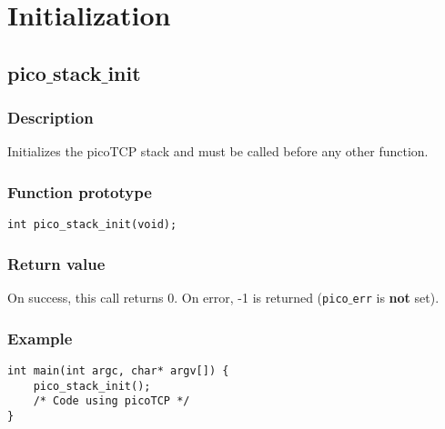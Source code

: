 \section{Initialization}

\subsection{pico$\_$stack$\_$init}

\subsubsection*{Description}
Initializes the picoTCP stack and must be called before any other function.

\subsubsection*{Function prototype}
\begin{verbatim}
int pico_stack_init(void);
\end{verbatim}

\subsubsection*{Return value}
On success, this call returns 0.
On error, -1 is returned (\texttt{pico$\_$err} is \textbf{not} set).

\subsubsection*{Example}
\begin{verbatim}
int main(int argc, char* argv[]) {
    pico_stack_init();
    /* Code using picoTCP */
}
\end{verbatim}
